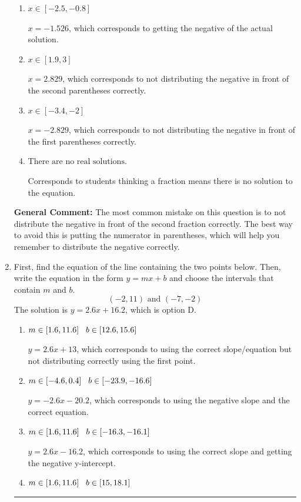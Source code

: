 \documentclass{extbook}[14pt]
\newcommand{\litem}[1]{\item #1

\rule{\textwidth}{0.4pt}}
\begin{document}
\begin{enumerate}
{\begin{enumerate}[label=\Alph*.]
* $x = 0.415$, which is the correct option.
\item \( x \in [-2.5, -0.8] \)

$x = -1.526$, which corresponds to getting the negative of the actual solution.
\item \( x \in [1.9, 3] \)

$x = 2.829$, which corresponds to not distributing the negative in front of the second parentheses correctly.
\item \( x \in [-3.4, -2] \)

$x = -2.829$, which corresponds to not distributing the negative in front of the first parentheses correctly.
\item \( \text{There are no real solutions.} \)

Corresponds to students thinking a fraction means there is no solution to the equation.
\end{enumerate}

\textbf{General Comment:} The most common mistake on this question is to not distribute the negative in front of the second fraction correctly. The best way to avoid this is putting the numerator in parentheses, which will help you remember to distribute the negative correctly.
}
\litem{
First, find the equation of the line containing the two points below. Then, write the equation in the form $ y=mx+b $ and choose the intervals that contain $m$ and $b$.
\[ (-2, 11) \text{ and } (-7, -2) \]The solution is \( y = 2.6x + 16.2 \), which is option D.\begin{enumerate}[label=\Alph*.]
\item \( m \in [1.6, 11.6] \hspace*{3mm} b \in [12.6, 15.6] \)

 $y = 2.6x + 13$, which corresponds to using the correct slope/equation but not distributing correctly using the first point.
\item \( m \in [-4.6, 0.4] \hspace*{3mm} b \in [-23.9, -16.6] \)

 $y = -2.6x -20.2$, which corresponds to using the negative slope and the correct equation.
\item \( m \in [1.6, 11.6] \hspace*{3mm} b \in [-16.3, -16.1] \)

 $y = 2.6x -16.2$, which corresponds to using the correct slope and getting the negative y-intercept.
\item \( m \in [1.6, 11.6] \hspace*{3mm} b \in [15, 18.1] \)


\end{enumerate}}
\end{enumerate}
\end{document}
